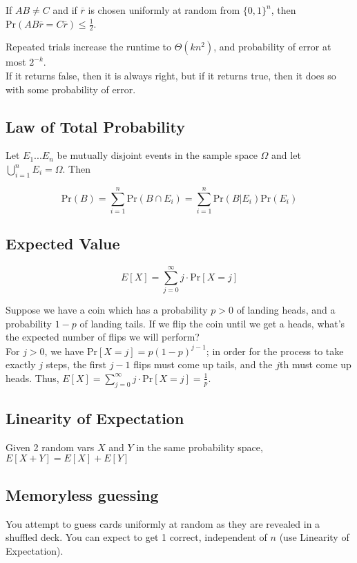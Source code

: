 If $AB \neq C$ and if $\overline{r}$ is chosen uniformly at random from $\{0, 1\}^n$, then $\text{Pr}(AB\overline{r} = C\overline{r}) \leq \frac{1}{2}$.

Repeated trials increase the runtime to $\Theta(kn^2)$, and probability of error at most $2^{-k}$.\\

If it returns false, then it is always right, but if it returns true, then it does so with some probability of error.

\subsection{Law of Total Probability}
Let $E_1 ... E_n$ be mutually disjoint events in the sample space $\Omega$ and let $\bigcup_{i=1}^{n} E_{i} = \Omega$. Then

\[
	\text{Pr}(B) = \sum_{i=1}^n \text{Pr}(B \cap E_i) = \sum_{i=1}^n \text{Pr}(B | E_i) \text{Pr}(E_i)
\]


\subsection{Expected Value}

\[
	E[X] = \sum_{j = 0}^\infty j \cdot \text{Pr}[X = j]
\]

Suppose we have a coin which has a probability $p > 0$ of landing heads, and a probability $1 - p$ of landing tails. If we flip the coin until we get a heads, what's the expected number of flips we will perform?\\

For $j > 0$, we have $\text{Pr}[X = j] = p(1 - p)^{j-1}$; in order for the process to take exactly $j$ steps, the first $j - 1$ flips must come up tails, and the $j$th must come up heads. Thus, $E[X] = \sum_{j = 0}^\infty j \cdot \text{Pr}[X = j] = \frac{1}{p}$.

\subsection{Linearity of Expectation}
Given 2 random vars $X$ and $Y$ in the same probability space, $E [X + Y] = E[ X ] + E [ Y ] $

\subsection{Memoryless guessing}
You attempt to guess cards uniformly at random as they are revealed in a shuffled deck. You can expect to get 1 correct, independent of $n$ (use Linearity of Expectation).

